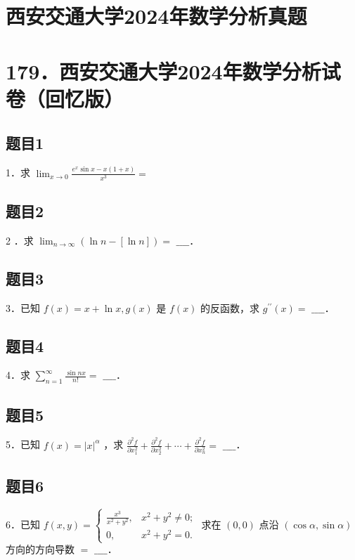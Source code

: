 \documentclass{article}
\begin{document}
\section*{西安交通大学2024年数学分析真题}
\section*{179．西安交通大学2024年数学分析试卷（回忆版）}

\subsection{题目1}
1．求 \(\lim _{x \rightarrow 0} \frac{e^{x} \sin x-x(1+x)}{x^{3}}=\)

\subsection{题目2}
2 ．求 \(\lim _{n \rightarrow \infty}(\ln n-[\ln n])=\) \(\_\_\_\_\)．

\subsection{题目3}
3．已知 \(f(x)=x+\ln x, g(x)\) 是 \(f(x)\) 的反函数，求 \(g^{\prime \prime}(x)=\) \(\_\_\_\_\)．

\subsection{题目4}
4．求 \(\sum_{n=1}^{\infty} \frac{\sin n x}{n!}=\) \(\_\_\_\_\)．

\subsection{题目5}
5．已知 \(f(x)=|x|^{\alpha}\) ，求 \(\frac{\partial^{2} f}{\partial x_{1}^{2}}+\frac{\partial^{2} f}{\partial x_{2}^{2}}+\cdots+\frac{\partial^{2} f}{\partial x_{n}^{2}}=\) \(\_\_\_\_\)．

\subsection{题目6}
6．已知 \(f(x, y)=\left\{\begin{array}{ll}\frac{x^{3}}{x^{2}+y^{2}}, & x^{2}+y^{2} \neq 0 ; \\ 0, & x^{2}+y^{2}=0 .\end{array}\right.\) 求在 \((0,0)\) 点沿 \((\cos \alpha, \sin \alpha)\) 方向的方向导数 \(=\) \(\_\_\_\_\)．
\end{document}
